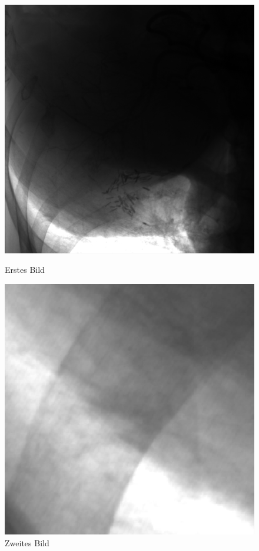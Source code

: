 \documentclass[a4paper,12pt]{article}
\theoremstyle{definition}
\theoremstyle{remark}
\begin{document}
\begin{figure}[H]
  \centering
  \begin{minipage}{0.49\textwidth}
    \centering
    \includegraphics[width=\linewidth]{Bilder/original.png}
    \caption{Erstes Bild}
    \label{fig:bild1}
  \end{minipage}
  \hfill
  \begin{minipage}{0.49\textwidth}
    \centering
    \includegraphics[width=\linewidth]{Bilder/original_zoomed.png}
    \caption{Zweites Bild}
    \label{fig:bild2}
  \end{minipage}
\end{figure}
\end{document}
